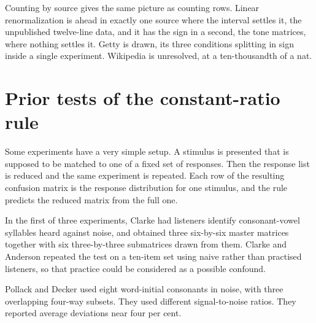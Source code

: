 \documentclass[11pt]{article}
\theoremstyle{italichead}
\begin{document}

Counting by source gives the same picture as counting rows. Linear renormalization is ahead in
exactly one source where the interval settles it, the unpublished twelve-line data, and it has
the sign in a second, the tone matrices, where nothing settles it. Getty is drawn, its three
conditions splitting in sign inside a single experiment. Wikipedia is unresolved, at a
ten-thousandth of a nat.

\section{Prior tests of the constant-ratio rule}
\label{sec:prior}

Some experiments have a very simple setup. A stimulus is presented that is supposed to be matched
to one of a fixed set of responses. Then the response list is reduced and the same experiment is
repeated. Each row of the resulting confusion matrix is the response distribution for one
stimulus, and the rule predicts the reduced matrix from the full one.

In the first of three experiments, Clarke \cite{clarke1957} had listeners identify consonant-vowel syllables heard against noise, and obtained three
six-by-six master matrices together with six three-by-three submatrices drawn from them. Clarke
and Anderson \cite{clarkeanderson1957} repeated the test on a ten-item set using naive rather
than practised listeners, so that practice could be considered as a possible confound.

Pollack and Decker \cite{pollackdecker1960} used eight word-initial consonants in noise, with
three overlapping four-way subsets. They used different signal-to-noise ratios. They reported
average deviations near four per cent.
\end{document}
